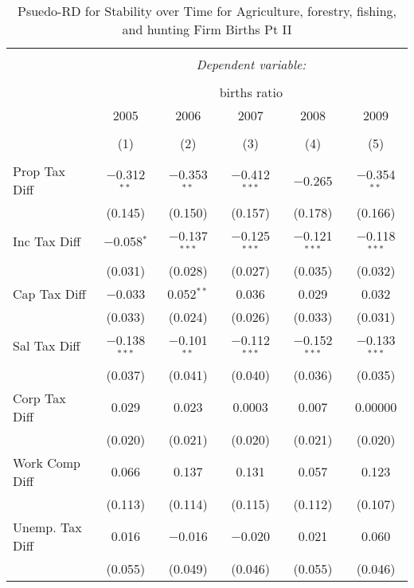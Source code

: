 
\begin{table}[!htbp] \centering 
  \caption{Psuedo-RD for Stability over Time for  Agriculture, forestry, fishing, and hunting Firm Births Pt II} 
  \label{11year} 
\small 
\begin{tabular}{@{\extracolsep{5pt}}lccccc} 
\\[-1.8ex]\hline 
\hline \\[-1.8ex] 
 & \multicolumn{5}{c}{\textit{Dependent variable:}} \\ 
\cline{2-6} 
\\[-1.8ex] & \multicolumn{5}{c}{births ratio} \\ 
 & 2005 & 2006 & 2007 & 2008 & 2009 \\ 
\\[-1.8ex] & (1) & (2) & (3) & (4) & (5)\\ 
\hline \\[-1.8ex] 
 Prop Tax Diff & $-$0.312$^{**}$ & $-$0.353$^{**}$ & $-$0.412$^{***}$ & $-$0.265 & $-$0.354$^{**}$ \\ 
  & (0.145) & (0.150) & (0.157) & (0.178) & (0.166) \\ 
  Inc Tax Diff & $-$0.058$^{*}$ & $-$0.137$^{***}$ & $-$0.125$^{***}$ & $-$0.121$^{***}$ & $-$0.118$^{***}$ \\ 
  & (0.031) & (0.028) & (0.027) & (0.035) & (0.032) \\ 
  Cap Tax Diff & $-$0.033 & 0.052$^{**}$ & 0.036 & 0.029 & 0.032 \\ 
  & (0.033) & (0.024) & (0.026) & (0.033) & (0.031) \\ 
  Sal Tax Diff & $-$0.138$^{***}$ & $-$0.101$^{**}$ & $-$0.112$^{***}$ & $-$0.152$^{***}$ & $-$0.133$^{***}$ \\ 
  & (0.037) & (0.041) & (0.040) & (0.036) & (0.035) \\ 
  Corp Tax Diff & 0.029 & 0.023 & 0.0003 & 0.007 & 0.00000 \\ 
  & (0.020) & (0.021) & (0.020) & (0.021) & (0.020) \\ 
  Work Comp Diff & 0.066 & 0.137 & 0.131 & 0.057 & 0.123 \\ 
  & (0.113) & (0.114) & (0.115) & (0.112) & (0.107) \\ 
  Unemp. Tax Diff & 0.016 & $-$0.016 & $-$0.020 & 0.021 & 0.060 \\ 
  & (0.055) & (0.049) & (0.046) & (0.055) & (0.046) \\ 

\end{tabular}
\end{table}
